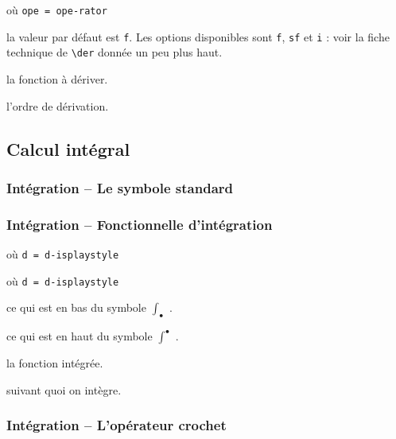\documentclass[12pt,a4paper]{article}
\newcommand\env[1]{\texttt{#1}}
\newcommand\macro[1]{\env{\textbackslash{}#1}}
\theoremstyle{definition}
\newcommand\extraspace{
	\vspace{0.25em}
}
\newcommand\mwhyprefix[2]{%
	\texttt{#1 = #1-#2}%
}
\begin{document}
 où \quad \mwhyprefix{ope}{rator}

\IDoption{} la valeur par défaut est \verb+f+. Les options disponibles sont \verb+f+, \verb+sf+ et \verb+i+ : voir la fiche technique de \macro{der} donnée un peu plus haut.

 la fonction à dériver.

 l'ordre de dérivation.



\subsection{Calcul intégral}

\subsubsection{Intégration -- Le symbole standard}






\subsubsection{Intégration -- Fonctionnelle d'intégration}



\extraspace

   où \quad \mwhyprefix{d}{isplaystyle}

  où \quad \mwhyprefix{d}{isplaystyle}

 ce qui est en bas du symbole $\int_{\bullet}$ .

 ce qui est en haut du symbole $\int^{\bullet}$ .

 la fonction intégrée.

 suivant quoi on intègre.





\subsubsection{Intégration -- L'opérateur crochet}


\end{document}

